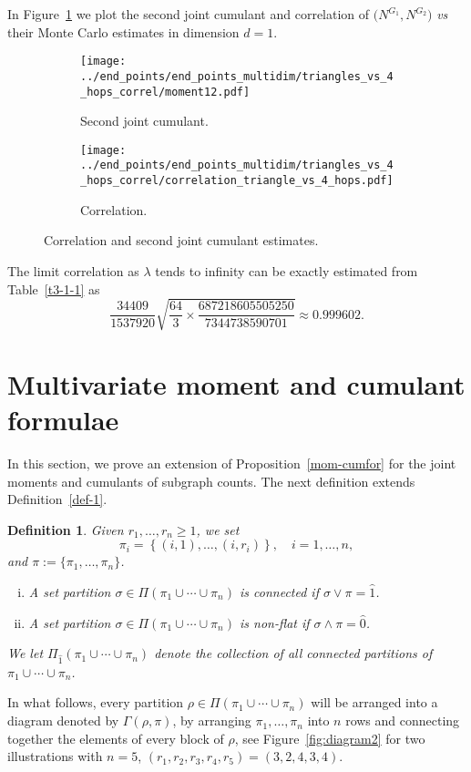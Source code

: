 \documentclass[12pt]{article}
\newtheorem{definition}[prop]{Definition}
\numberwithin{equation}{section}
\begin{document}
\vspace{-0.4cm}

\noindent
In Figure~\ref{fig2-11-3} we plot the 
second joint cumulant and correlation of $\big({N}^{G_1},{N}^{G_2}\big)$ 
 {\em vs} their Monte Carlo estimates
 in dimension $d=1$. 

 \begin{figure}[H]
  \centering
 \begin{subfigure}[b]{0.50\textwidth}
 \hskip-0.5cm
    \texttt{[image: ../end\_points/end\_points\_multidim/triangles\_vs\_4\_hops\_correl/moment12.pdf]} 
    \caption{Second joint cumulant.} 
 \end{subfigure}
  \centering
  \begin{subfigure}[b]{0.49\textwidth}
  \hskip-0.3cm
    \texttt{[image: ../end\_points/end\_points\_multidim/triangles\_vs\_4\_hops\_correl/correlation\_triangle\_vs\_4\_hops.pdf]} 
    \caption{Correlation.} 
 \end{subfigure}
\caption{Correlation and second joint cumulant estimates.} 
\label{fig2-11-3} 
\end{figure}
\noindent
The limit correlation as $\lambda$ tends to infinity can be
exactly estimated from Table~\ref{t3-1-1} as 
$$
\frac{34409 }{1537920} \sqrt{\frac{64}{3} \times
  \frac{687218605505250}{7344738590701}} \approx 0.999602.
$$ 

\appendix

\section{Multivariate moment and cumulant formulae}
\label{appendixa}
\noindent 
In this section, we prove an extension of Proposition~\ref{mom-cumfor}
for the joint moments and cumulants of subgraph counts. 
The next definition extends Definition~\ref{def-1}.
\begin{definition}
Given $r_1,\dots,r_n \geq 1$, we set 
$$
  \pi_i=\left\{(i,1), \ldots ,(i,r_i)\right\},
  \quad
  i=1, \ldots , n, 
$$
 and $\pi := \{ \pi_1,\ldots , \pi_n \}$. 
\begin{enumerate}[i)]
   \item A set partition $\sigma\in\Pi( \pi_1 \cup \cdots \cup \pi_n )$ is connected if $\sigma\vee\pi=\widehat{1}$.      
\item 
 A set partition $\sigma\in\Pi ( \pi_1 \cup \cdots \cup \pi_n )$ is non-flat if $\sigma\wedge\pi=\widehat{0}$. 
\end{enumerate} 
\noindent
 We let $\Pi_{\widehat{1}}( \pi_1 \cup \cdots \cup \pi_n )$ denote the collection of all connected partitions of $\pi_1 \cup \cdots \cup \pi_n$. 
\end{definition}
  In what follows, every partition
  $\rho \in \Pi(\pi_1\cup \cdots \cup \pi_n )$
  will be arranged into a 
 diagram denoted by $\Gamma(\rho ,\pi)$, 
 by arranging $\pi_1,\dots,\pi_n$ into $n$ rows 
 and connecting together the elements of every block of $\rho$, 
 see 
 Figure~\ref{fig:diagram2} for two illustrations with
 $n=5$, 
 $(r_1, r_2 , r_3 , r_4 , r_5) = (3,2,4,3,4)$. 
 
\end{document}
